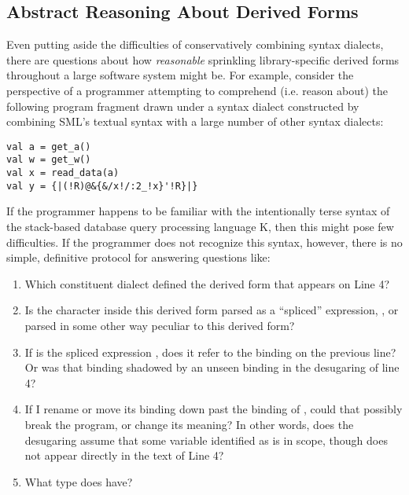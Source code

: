 \subsection{Abstract Reasoning About Derived Forms}\label{sec:abs-reasoning-intro}
Even putting aside the difficulties of conservatively combining syntax dialects, there are questions about how \emph{reasonable} sprinkling library-specific derived forms throughout a large software system might be. 
For example, consider the perspective of a programmer attempting to comprehend (i.e. reason about) the following program fragment drawn under a syntax dialect constructed by combining SML's textual syntax with a large number of other syntax dialects:
\begin{lstlisting}
val a = get_a()
val w = get_w()
val x = read_data(a)
val y = {|(!R)@&{&/x!/:2_!x}'!R}|}
\end{lstlisting}

If the programmer happens to be familiar with the intentionally terse syntax of the stack-based database query processing language K, then this might pose few difficulties. If the programmer does not recognize this syntax, however, there is no simple, definitive protocol for answering questions like:

\begin{enumerate}
\item Which constituent dialect defined the derived form that appears on Line 4?
\item Is the character  inside this derived form parsed as a ``spliced'' expression, , or parsed in some other way peculiar to this derived form?
\item If  is the spliced expression , does it refer to the binding on the previous line? Or was that binding shadowed by an unseen binding in the desugaring of line 4?
\item If I rename  or move its binding down past the binding of , could that possibly break the program, or change its meaning? In other words, does the desugaring  assume that some variable identified as  is in scope, though  does not appear directly in the text of Line 4?
\item What type does  have?
\end{enumerate}


